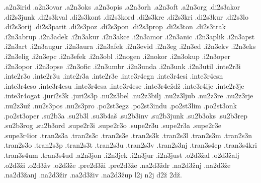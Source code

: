 {.a2n3irid
.a2n3ovar
.a2n3oks
.a2n3opis
.a2n3orh
.a2n3oft
.a2n3org
.di2s3akor
.di2s3junk
.di2s3kval
.di2s3kont
.di2s3kord
.di2s3kre
.di2s3kri
.di2s3kur
.di2s3lo
.di2s3orij
.di2s3parit
.di2s3poz
.di2s3pon
.di2s3prop
.di2s3ton
.di2s3trak
.i2n3abrup
.i2n3adek
.i2n3akur
.i2n3akce
.i2n3amor
.i2n3anic
.i2n3aplik
.i2n3apst
.i2n3art
.i2n3augur
.i2n3aura
.i2n3afek
.i2n3evid
.i2n3eg
.i2n3ed
.i2n3ekv
.i2n3eks
.i2n3elig
.i2n3epc
.i2n3efek
.i2n3obl
.i2nogen
.i2nokor
.i2n3okup
.i2n3oper
.i2n3opor
.i2n3opse
.i2n3ofic
.i2n3umbr
.i2n3unda
.i2n3unk
.i2n3util
.inte2r3i
.inte2r3o
.inte2r3u
.inte2r3a
.inte2r3e
.inte3r4egn
.inte3r4esi
.inte3r4esn
.inte3r4eso
.inte3r4esu
.inte3r4esa
.inte3r4ese
.inte3r4eždž
.inte3r4ije
.inte2r3je
.inte3r4ogat
.juri2s3k
.juri2s3p
.nu2z3bel
.nu2z3bilj
.nu2z3ljub
.nu2z3re
.nu2z3rje
.nu2z3už
.nu2s3pos
.nu2s3pro
.po2st3egz
.po2st3indu
.po2st3lim
.po2st3onk
.po2st3oper
.su2b3a
.su2b3l
.su3b4aš
.su2b3inv
.su2b3junk
.su2b3oks
.su2b3rep
.su2b3rog
.su2b3ord
.supe2r3i
.supe2r3o
.supe2r3u
.supe2r3a
.supe2r3e
.supe3r4ior
.tran2s3a
.tran2s3c
.tran2s3e
.tran2s3k
.tran2s3l
.tran2s3m
.tran2s3n
.tran2s3o
.tran2s3p
.tran2s3t
.tran2s3u
.tran2s3v
.tran2s3nj
.tran3s4ep
.tran3s4kri
.tran3s4um
.tran3s4ud
.a2n3jon
.i2n3jek
.i2n3jur
.i2n3just
.o2d3žal
.o2d3žalj
.o2d3ži
.o2d3žv
.o2d3že
.pre2d3ži
.pre2d3že
.na2d3ždr
.na2d3žnj
.na2d3že
.na2d3žanj
.na2d3žir
.na2d3živ
.na2d3žup
l2j
n2j
d2ž
2dž.
}
%
